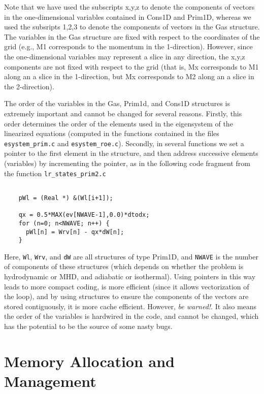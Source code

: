 Note that we have used the subscripts x,y,z to denote the components of 
vectors in the one-dimensional variables contained in Cons1D and Prim1D,
whereas we used the subsripts 1,2,3 to denote the components of vectors
in the Gas structure.  The variables in the Gas structure are fixed
with respect to the coordinates of the grid (e.g., M1 corresponds to the
momentum in the 1-direction).  However, since the one-dimensional variables
may represent a slice in any direction, the x,y,z components are not fixed
with respect to the grid (that is, Mx corresponds to M1 along an a slice in
the 1-direction, but Mx corresponds to M2 along an a slice in
the 2-direction).

The order of the variables in the Gas, Prim1d, and Cons1D structures is
extremely important and
cannot be changed for several reasons.  Firstly, this order determines the
order of the elements used in the eigensystem of the linearized equations
(computed in the functions contained in the files {\tt esystem\_prim.c}
and {\tt esystem\_roe.c}).  Secondly, in several functions we set a
pointer to the first element in the structure, and then address successive
elements (variables) by incrementing the pointer, as in the
following code fragment from the function {\tt lr\_states\_prim2.c}

\footnotesize
\begin{verbatim}

    pWl = (Real *) &(Wl[i+1]);

    qx = 0.5*MAX(ev[NWAVE-1],0.0)*dtodx;
    for (n=0; n<NWAVE; n++) {
      pWl[n] = Wrv[n] - qx*dW[n];
    }

\end{verbatim}
\normalsize
Here, {\tt Wl}, {\tt Wrv}, and {\tt dW} are all structures of type Prim1D,
and {\tt NWAVE} is the number of components of these structures (which depends
on whether the problem is hydrodynamic or MHD, and adiabatic or isothermal).
Using pointers in this way leads to more compact coding, is more efficient
(since it allows vectorization of the loop), and by using structures to 
ensure the components of the vectors are stored contiguously, it is more
cache efficient.  However, {\em be warned!}.  It also means the order of
the variables is hardwired
in the code, and cannot be changed, which has the potential to be the source
of some nasty bugs.

\section{Memory Allocation and Management}

